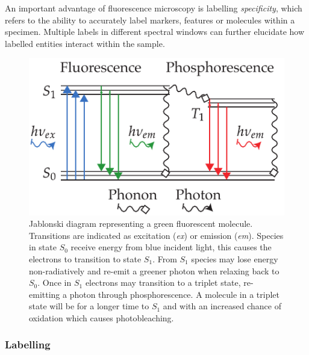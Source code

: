 An important advantage of fluorescence microscopy is labelling \emph{\gls{specificity}}, which refers to the ability to accurately label markers, features or molecules within a specimen.
Multiple labels in different spectral windows can further elucidate how labelled entities interact within the sample.

\begin{figure}
    \centering
    \includegraphics{jablonski_triplet_newer}
    \caption[Standard jablonski diagram]{
    Jablonski diagram representing a green fluorescent molecule.
    Transitions are indicated as excitation (\emph{ex}) or emission (\emph{em}). %
    Species in state \(S_0 \) receive energy from blue incident light,
    this causes the electrons to transition to state \(S_1 \).
    From \(S_1 \) species may lose energy non-radiatively and re-emit a greener photon when relaxing back to \(S_0 \).
    Once in \(S_1 \) electrons may transition to a triplet state, re-emitting a photon through phosphorescence.
    A molecule in a triplet state will be for a longer time to \(S_1 \) and with an increased chance of oxidation which causes photobleaching.%
    }\label{fig:jablonski_triplet_new}
\end{figure}


\subsubsection{Labelling}

